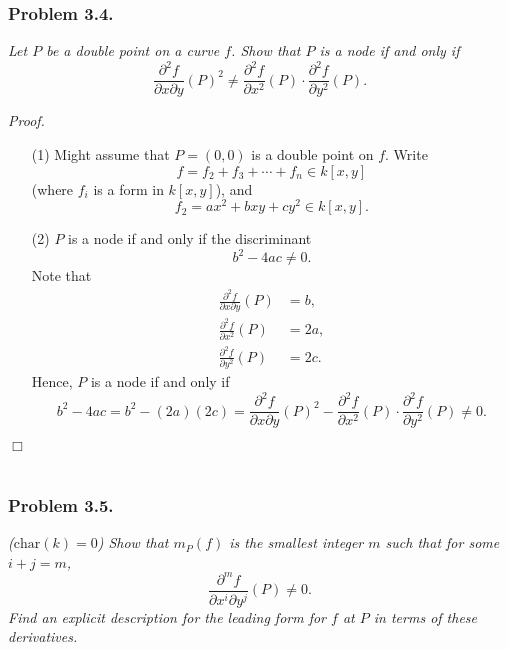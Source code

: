 \documentclass{article}
\begin{document}



\subsubsection*{Problem 3.4.}
\emph{Let $P$ be a double point on a curve $f$.
Show that $P$ is a node if and only if}
\[
  \frac{\partial^2 f}{\partial x \partial y}(P)^2
  \neq
  \frac{\partial^2 f}{\partial x^2}(P)
  \cdot
  \frac{\partial^2 f}{\partial y^2}(P).
\]



\emph{Proof.}
\begin{enumerate}
\item[(1)]
  Might assume that $P = (0,0)$ is a double point on $f$.
  Write
  \[
    f = f_2 + f_3 + \cdots + f_n \in k[x,y]
  \]
  (where $f_i$ is a form in $k[x,y]$),
  and
  \[
    f_2 = ax^2 + bxy + cy^2 \in k[x,y].
  \]

\item[(2)]
  $P$ is a node if and only if the discriminant
  \[
    b^2 - 4ac \neq 0.
  \]
  Note that
  \begin{align*}
    \frac{\partial^2 f}{\partial x \partial y}(P)
    &= b, \\
    \frac{\partial^2 f}{\partial x^2}(P)
    &= 2a, \\
    \frac{\partial^2 f}{\partial y^2}(P)
    &= 2c.
  \end{align*}
  Hence,
  $P$ is a node if and only if
  \[
    b^2 - 4ac
    = b^2 - (2a)(2c)
    = \frac{\partial^2 f}{\partial x \partial y}(P)^2
      - \frac{\partial^2 f}{\partial x^2}(P) \cdot \frac{\partial^2 f}{\partial y^2}(P)
    \neq 0.
  \]
\end{enumerate}
$\Box$ \\\\






\subsubsection*{Problem 3.5.}
\emph{($\mathrm{char}(k) = 0$)
Show that $m_P(f)$ is the smallest integer $m$ such that
for some $i + j = m$,
\[
  \frac{\partial^{m} f}{\partial x^i \partial y^j}(P) \neq 0.
\]
Find an explicit description for the leading form for $f$ at $P$ in
terms of these derivatives.} \\
\end{document}
